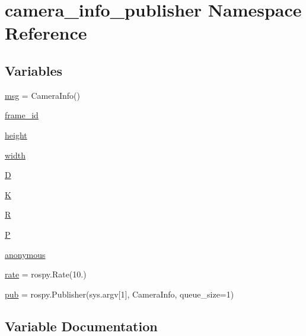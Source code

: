 \hypertarget{namespacecamera__info__publisher}{}\section{camera\+\_\+info\+\_\+publisher Namespace Reference}
\label{namespacecamera__info__publisher}
\subsection*{Variables}
\begin{DoxyCompactItemize}
\item 
\hyperlink{namespacecamera__info__publisher_a2d8ee42f50f0f1a2f44f8287e3d65fde}{msg} = Camera\+Info()
\item 
\hyperlink{namespacecamera__info__publisher_a7f59bda2969259184c03febc1d727bd6}{frame\+\_\+id}
\item 
\hyperlink{namespacecamera__info__publisher_a067a669c555177e826c9b42f9f32fcf3}{height}
\item 
\hyperlink{namespacecamera__info__publisher_a446dc1352be5699a99f9660084e54054}{width}
\item 
\hyperlink{namespacecamera__info__publisher_ab2708da5cf95209018c33acdf374063f}{D}
\item 
\hyperlink{namespacecamera__info__publisher_ae45fa74c6c253f2ebea439d68bdc1fe3}{K}
\item 
\hyperlink{namespacecamera__info__publisher_a9658edfae454ca997cf347704aaa72c3}{R}
\item 
\hyperlink{namespacecamera__info__publisher_a6810e43381f6898ecd0cbedb8a569a7e}{P}
\item 
\hyperlink{namespacecamera__info__publisher_a974733f566916645397703bbee3273d9}{anonymous}
\item 
\hyperlink{namespacecamera__info__publisher_a41969f5fd2d4f608064d7b2d1513450a}{rate} = rospy.\+Rate(10.)
\item 
\hyperlink{namespacecamera__info__publisher_adcc8066d95987066960a2d4861b9a2b9}{pub} = rospy.\+Publisher(sys.\+argv\mbox{[}1\mbox{]}, Camera\+Info, queue\+\_\+size=1)
\end{DoxyCompactItemize}


\subsection{Variable Documentation}
\mbox{\label{namespacecamera__info__publisher_a974733f566916645397703bbee3273d9}} 
